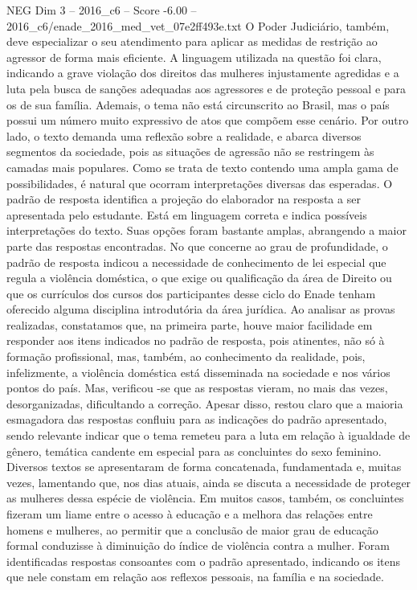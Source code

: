 \begin{textsample}{NEG Dim 3 – 2016\_c6 – Score -6.00 – 2016\_c6/enade\_2016\_med\_vet\_07e2ff493e.txt}
O Poder Judiciário, também, deve especializar o seu atendimento para aplicar as medidas de restrição ao agressor de forma mais eficiente.
A linguagem utilizada na questão foi clara, indicando a grave violação dos direitos das mulheres injustamente agredidas e a luta pela busca de sanções adequadas aos agressores e de proteção pessoal e para os de sua família.
Ademais, o tema não está circunscrito ao Brasil, mas o país possui um número muito expressivo de atos que compõem esse cenário.
Por outro lado, o texto demanda uma reflexão sobre a realidade, e abarca diversos segmentos da sociedade, pois as situações de agressão não se restringem às camadas mais populares.
Como se trata de texto contendo uma ampla gama de possibilidades, é natural que ocorram interpretações diversas das esperadas.
O padrão de resposta identifica a projeção do elaborador na resposta a ser apresentada pelo estudante.
Está em linguagem correta e indica possíveis interpretações do texto.
Suas opções foram bastante amplas, abrangendo a maior parte das respostas encontradas.
No que concerne ao grau de profundidade, o padrão de resposta indicou a necessidade de conhecimento de lei especial que regula a violência doméstica, o que exige ou qualificação da área de Direito ou que os currículos dos cursos dos participantes desse ciclo do Enade tenham oferecido alguma disciplina introdutória da área jurídica.
Ao analisar as provas realizadas, constatamos que, na primeira parte, houve maior facilidade em responder aos itens indicados no padrão de resposta, pois atinentes, não só à formação profissional, mas, também, ao conhecimento da realidade, pois, infelizmente, a violência doméstica está disseminada na sociedade e nos vários pontos do país.
Mas, verificou -se que as respostas vieram, no mais das vezes, desorganizadas, dificultando a correção.
Apesar disso, restou claro que a maioria esmagadora das respostas confluiu para as indicações do padrão apresentado, sendo relevante indicar que o tema remeteu para a luta em relação à igualdade de gênero, temática candente em especial para as concluintes do sexo feminino.
Diversos textos se apresentaram de forma concatenada, fundamentada e, muitas vezes, lamentando que, nos dias atuais, ainda se discuta a necessidade de proteger as mulheres dessa espécie de violência.
Em muitos casos, também, os concluintes fizeram um liame entre o acesso à educação e a melhora das relações entre homens e mulheres, ao permitir que a conclusão de maior grau de educação formal conduzisse à diminuição do índice de violência contra a mulher.
Foram identificadas respostas consoantes com o padrão apresentado, indicando os itens que nele constam em relação aos reflexos pessoais, na família e na sociedade.

\end{textsample}
